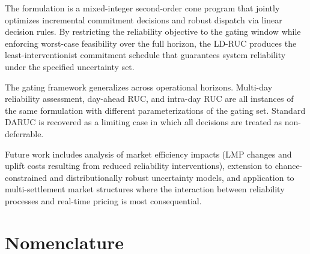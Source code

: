 \documentclass[journal]{IEEEtran}
\begin{document}
The formulation is a mixed-integer second-order cone program that
jointly optimizes incremental commitment decisions and robust dispatch
via linear decision rules.
By restricting the reliability objective to the gating window while
enforcing worst-case feasibility over the full horizon, the LD-RUC
produces the least-interventionist commitment schedule that guarantees
system reliability under the specified uncertainty set.

The gating framework generalizes across operational horizons.
Multi-day reliability assessment, day-ahead RUC, and intra-day RUC
are all instances of the same formulation with different
parameterizations of the gating set.
Standard DARUC is recovered as a limiting case in which all decisions
are treated as non-deferrable.


Future work includes analysis of market efficiency impacts (LMP
changes and uplift costs resulting from reduced reliability
interventions), extension to chance-constrained and distributionally
robust uncertainty models, and application to multi-settlement market
structures where the interaction between reliability processes and
real-time pricing is most consequential.



\appendices
\section{Nomenclature}\label{app:nomenclature}
\end{document}
